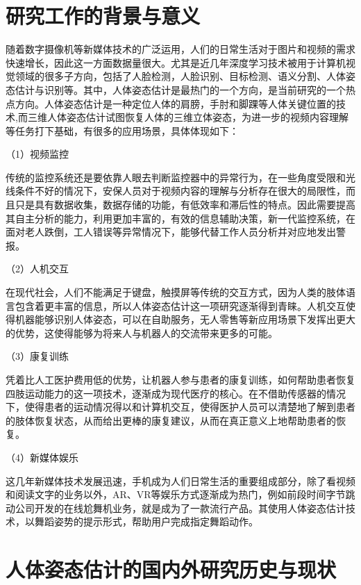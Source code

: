 \thesischapterexordium

\section{研究工作的背景与意义}

随着数字摄像机等新媒体技术的广泛运用，人们的日常生活对于图片和视频的需求快速增长，因此这一方面数据量很大。尤其是近几年深度学习技术被用于计算机视觉领域的很多子方向，包括了人脸检测，人脸识别、目标检测、语义分割、人体姿态估计与识别等。其中，人体姿态估计是最热门的一个方向，是当前研究的一个热点方向。人体姿态估计是一种定位人体的肩膀，手肘和脚踝等人体关键位置的技术,而三维人体姿态估计试图恢复人体的三维立体姿态，为进一步的视频内容理解等任务打下基础，有很多的应用场景，具体体现如下：

（1）视频监控

传统的监控系统还是要依靠人眼去判断监控器中的异常行为，在一些角度受限和光线条件不好的情况下，安保人员对于视频内容的理解与分析存在很大的局限性，而且只是具有数据收集，数据存储的功能，有低效率和滞后性的特点。因此需要提高其自主分析的能力，利用更加丰富的，有效的信息辅助决策，新一代监控系统，在面对老人跌倒，工人错误等异常情况下，能够代替工作人员分析并对应地发出警报。

（2）人机交互

在现代社会，人们不能满足于键盘，触摸屏等传统的交互方式，因为人类的肢体语言包含着更丰富的信息，所以人体姿态估计这一项研究逐渐得到青睐。人机交互使得机器能够识别人体姿态，可以在自助服务，无人零售等新应用场景下发挥出更大的优势，这使得能够为将来人与机器人的交流带来更多的可能。

（3）康复训练

凭着比人工医护费用低的优势，让机器人参与患者的康复训练，如何帮助患者恢复四肢运动能力的这一项技术，逐渐成为现代医疗的核心。在不借助传感器的情况下，使得患者的运动情况得以和计算机交互，使得医护人员可以清楚地了解到患者的肢体恢复状态，从而给出更棒的康复建议，从而在真正意义上地帮助患者的恢复。

（4）新媒体娱乐

这几年新媒体技术发展迅速，手机成为人们日常生活的重要组成部分，除了看视频和阅读文字的业务以外，AR、VR等娱乐方式逐渐成为热门，例如前段时间字节跳动公司开发的在线尬舞机业务，就是成为了一款流行产品。其使用人体姿态估计技术，以舞蹈姿势的提示形式，帮助用户完成指定舞蹈动作。

\section{人体姿态估计的国内外研究历史与现状}


